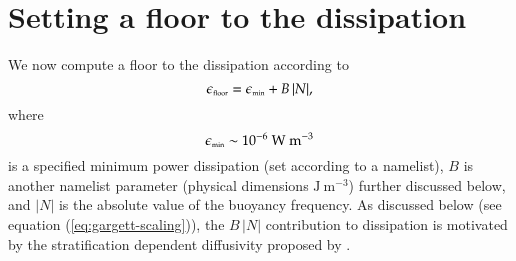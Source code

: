 \section{Setting a floor to the dissipation} 
\label{section:setting-a-floor-to-dissipation}


We now compute a floor to the dissipation according to 
\begin{equation}
 \epsilon_{\mbox{\tiny floor}} =  \epsilon_{\mbox{\tiny min}} + B \, |N|, 
\end{equation}
 where 
\begin{equation}
  \epsilon_{\mbox{\tiny min}} \sim 10^{-6}~\mbox{W}~\mbox{m}^{-3}
\end{equation}
is a specified minimum power dissipation (set according to a
namelist), $B$ is another namelist parameter (physical dimensions
$\mbox{J}~\mbox{m}^{-3}$) further discussed below, and $|N|$ is the
absolute value of the buoyancy frequency.  As discussed below (see
equation (\ref{eq:gargett-scaling})), the $B \, |N|$ contribution to
dissipation is motivated by the stratification dependent diffusivity
proposed by \cite{Gargett1984}.

